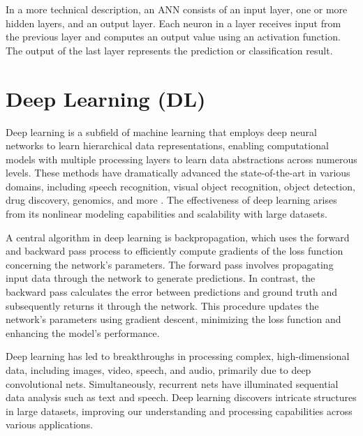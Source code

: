 



In a more technical description, an ANN consists of an input layer, one or more hidden layers, and an output layer. Each neuron in a layer receives input from the previous layer and computes an output value using an activation function. The output of the last layer represents the prediction or classification result.





\section{Deep Learning (DL)}


Deep learning is a subfield of machine learning that employs deep neural networks to learn hierarchical data representations, enabling computational models with multiple processing layers to learn data abstractions across numerous levels. These methods have dramatically advanced the state-of-the-art in various domains, including speech recognition, visual object recognition, object detection, drug discovery, genomics, and more \cite{LeCun2015DeepLearning}. The effectiveness of deep learning arises from its nonlinear modeling capabilities and scalability with large datasets.

A central algorithm in deep learning is backpropagation, which uses the forward and backward pass process to efficiently compute gradients of the loss function concerning the network's parameters. The forward pass involves propagating input data through the network to generate predictions. In contrast, the backward pass calculates the error between predictions and ground truth and subsequently returns it through the network. This procedure updates the network's parameters using gradient descent, minimizing the loss function and enhancing the model's performance.

Deep learning has led to breakthroughs in processing complex, high-dimensional data, including images, video, speech, and audio, primarily due to deep convolutional nets. Simultaneously, recurrent nets have illuminated sequential data analysis such as text and speech. Deep learning discovers intricate structures in large datasets, improving our understanding and processing capabilities across various applications.



\newpage



